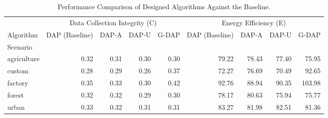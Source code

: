 \begin{table}
\caption{Performance Comparison of Designed Algorithms Against the Baseline.}
\label{tab:final_static_results}
\begin{tabular}{lrrrrrrrr}
\toprule
 & \multicolumn{4}{c}{Data Collection Integrity (C)} & \multicolumn{4}{c}{Energy Efficiency (E)} \\
Algorithm & DAP (Baseline) & DAP-A & DAP-U & G-DAP & DAP (Baseline) & DAP-A & DAP-U & G-DAP \\
Scenario &  &  &  &  &  &  &  &  \\
\midrule
agriculture & 0.32 & 0.31 & 0.30 & 0.30 & 79.22 & 78.43 & 77.40 & 75.95 \\
custom & 0.28 & 0.29 & 0.26 & 0.37 & 72.27 & 76.69 & 70.49 & 92.65 \\
factory & 0.35 & 0.33 & 0.30 & 0.42 & 92.76 & 88.94 & 90.35 & 103.98 \\
forest & 0.32 & 0.32 & 0.29 & 0.30 & 78.17 & 80.63 & 75.94 & 75.77 \\
urban & 0.33 & 0.32 & 0.31 & 0.31 & 83.27 & 81.98 & 82.51 & 81.36 \\
\bottomrule
\end{tabular}
\end{table}
